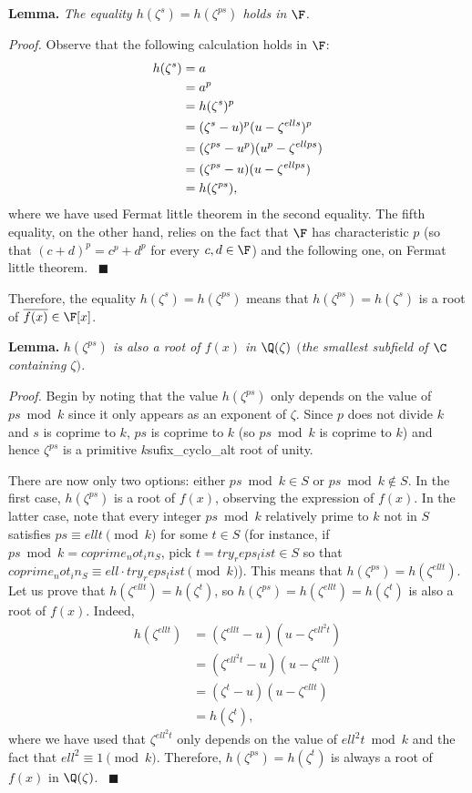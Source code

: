 \textbf{Lemma.} \emph{The equality $h(\zeta^s)=h(\zeta^{ps})$ holds in $\F$.}

\textit{Proof.} Observe that the following calculation holds in $\F$:
\begin{align}\label{eq:reproots}
h(\zeta^{s})&=a\notag \\ 
&=a^p\notag \\ 
&=h(\zeta^{s})^p\notag \\ 
&=(\zeta^{s}-{u})^p({u}-\zeta^{{ell}s})^p\notag \\ 
&=(\zeta^{ps}-{u}^p)({u}^p-\zeta^{{ell}ps})\notag \\ 
&=(\zeta^{ps}-{u})({u}-\zeta^{{ell}ps})\notag \\ 
&=h(\zeta^{ps}),
\end{align}
where we have used Fermat little theorem in the second equality. The fifth equality, on the other hand, relies on the fact that $\F$ has characteristic $p$ (so that $(c+d)^p=c^p+d^p$ for every $c,d \in \F$) and the following one, on Fermat little theorem. \ $\blacksquare$

Therefore, the equality $h(\zeta^{s})=h(\zeta^{ps})$ means that $h(\zeta^{ps})=h(\zeta^{s})$ is a root of $\overline{f(x)}\in\F[x]$. 

\textbf{Lemma.} \emph{$h(\zeta^{ps})$ is also a root of $f(x)$ in $\Q(\zeta)$ $($the smallest subfield of $\C$ containing $\zeta)$.}

\textit{Proof.} Begin by noting that the value $h(\zeta^{ps})$ only depends on the value of $ps \bmod{{k}}$ since it only appears as an exponent of $\zeta$. Since $p$ does not divide ${k}$ and $s$ is coprime to ${k}$, $ps$ is coprime to ${k}$ (so $ps \bmod{{k}}$ is coprime to ${k}$) and hence $\zeta^{ps}$ is a primitive ${k}${sufix_cyclo_alt} root of unity.

There are now only two options: either $ps \bmod{{k}}\in S$ or $ps \bmod{{k}}\notin S$. In the first case, $h(\zeta^{ps})$ is a root of $f(x)$, observing the expression of $f(x)$. In the latter case, note that every integer $ps \bmod{{k}}$ relatively prime to ${k}$ not in $S$ satisfies $ps\equiv {ell}t\pmod{{k}}$ for some $t\in S$ (for instance, if $ps \bmod{{k}}={coprime_not_in_S}$, pick $t={try_reps_list}\in S$ so that ${coprime_not_in_S}\equiv {ell}\cdot{try_reps_list} \pmod{{k}}$). This means that $h(\zeta^{ps})=h(\zeta^{{ell}t})$. Let us prove that $h(\zeta^{{ell}t})=h(\zeta^{t})$, so $h(\zeta^{ps})=h(\zeta^{{ell}t})=h(\zeta^{t})$ is also a root of $f(x)$. Indeed,
\begin{align*}
h(\zeta^{{ell}t})&=(\zeta^{{ell}t}-{u})({u}-\zeta^{{ell}^2t})\\
&=(\zeta^{{ell}^2t}-{u})({u}-\zeta^{{ell}t})\\
&=(\zeta^{t}-{u})({u}-\zeta^{{ell}t})\\
&=h(\zeta^{t}),
\end{align*}
where we have used that $\zeta^{{ell}^2t}$ only depends on the value of ${ell}^2t \bmod{{k}}$ and the fact that ${ell}^2\equiv 1\pmod{{k}}$. Therefore, $h(\zeta^{ps})=h(\zeta^{t})$ is always a root of $f(x)$ in $\Q(\zeta)$. \ $\blacksquare$

